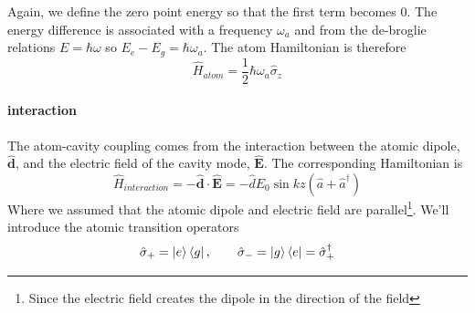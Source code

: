 Again, we define the zero point energy so that the first term becomes $0$. The energy difference is associated with a frequency $\omega_a$ and from the de-broglie relations $E = \hbar\omega$ so $E_e - E_g = \hbar\omega_a$. The atom Hamiltonian is therefore
\begin{equation}
    \boxed{\hat{H}_{atom} = \frac{1}{2}\hbar\omega_a\hat{\sigma}_z}
\end{equation}

\paragraph*{interaction}
The atom-cavity coupling comes from the interaction between the atomic dipole, $\hat{\textbf{d}}$, and the electric field of the cavity mode, $\hat{\textbf{E}}$. The corresponding Hamiltonian is
\[
\hat{H}_{interaction} = -\hat{\textbf{d}}\cdot\hat{\textbf{E}} = -\hat{d} E_0 \sin{kz} (\hat{a} + \hat{a}^\dag{})
\]
Where we assumed that the atomic dipole and electric field are parallel\footnote{Since the electric field creates the dipole in the direction of the field}.
We'll introduce the atomic transition operators
\[
    \hat{\sigma}_+ = \ket{e}\bra{g}, \quad\quad \hat{\sigma}_- = \ket{g}\bra{e} = \hat{\sigma}_+^{\dag{}}
\]

